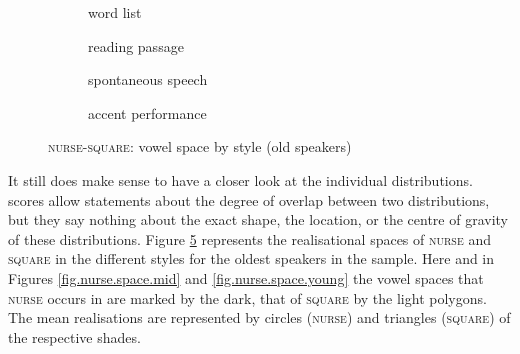 \begin{figure}[h!]
	\centering
	\begin{subfigure}{.49\textwidth}
		\centering
			\resizebox{\linewidth}{!}{} 
		\caption{word list}
		\label{fig.nurse.space.old.list}
	\end{subfigure}
	\begin{subfigure}{.49\textwidth}
		\centering
			\resizebox{\linewidth}{!}{} 
		\caption{reading passage}
		\label{fig.nurse.space.old.read}
	\end{subfigure}
	
	\begin{subfigure}{.49\textwidth}
		\centering
			\resizebox{\linewidth}{!}{} 
		\caption{spontaneous speech}
		\label{fig.nurse.space.old.free}
	\end{subfigure}
	\begin{subfigure}{.49\textwidth}
		\centering
			\resizebox{\linewidth}{!}{} 
		\caption{accent performance}
		\label{fig.nurse.space.old.imit}
	\end{subfigure}
	
	\caption{\textsc{nurse}-\textsc{square}: vowel space by style (old speakers)}
	\label{fig.nurse.space.old}
\end{figure}

It still does make sense to have a closer look at the individual distributions.
 scores allow statements about the degree of overlap between two distributions, but they say nothing about the exact shape, the location, or the centre of gravity of these distributions.
Figure \ref{fig.nurse.space.old} represents the realisational spaces of \textsc{nurse} and \textsc{square} in the different styles for the oldest speakers in the sample.
Here and in Figures \ref{fig.nurse.space.mid} and \ref{fig.nurse.space.young} the vowel spaces that \textsc{nurse} occurs in are marked by the dark, that of \textsc{square} by the light polygons.
The mean realisations are represented by circles (\textsc{nurse}) and triangles (\textsc{square}) of the respective shades.

